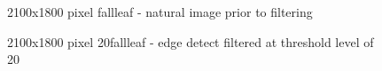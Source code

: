 \documentclass[12pt, oneside]{book}
\begin{document}
\begin{figure}[!b]
  \centering
  \caption[2100x1800 pixel fallleaf]{2100x1800 pixel fallleaf - natural image prior to filtering}
  \label{fig:fallleaf_bmp}
\end{figure}

\begin{figure}[!b]
  \centering
  \caption[2100x1800 pixel 20fallleaf]{2100x1800 pixel 20fallleaf - edge detect filtered at threshold level of 20}
  \label{fig:20fallleaf_png}
\end{figure}
\end{document}
